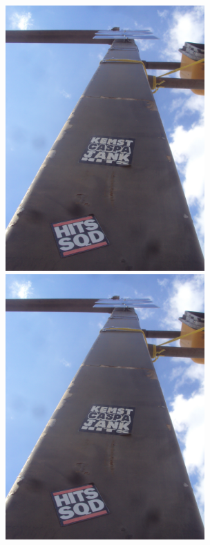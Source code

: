 \documentclass[10pt,letterpaper]{article}
\begin{document}
\vspace{0.25in}
\includegraphics[height=4in]{portrait.jpg}
\includegraphics[height=4in]{portrait.jpg}

\pagebreak
\end{document}
